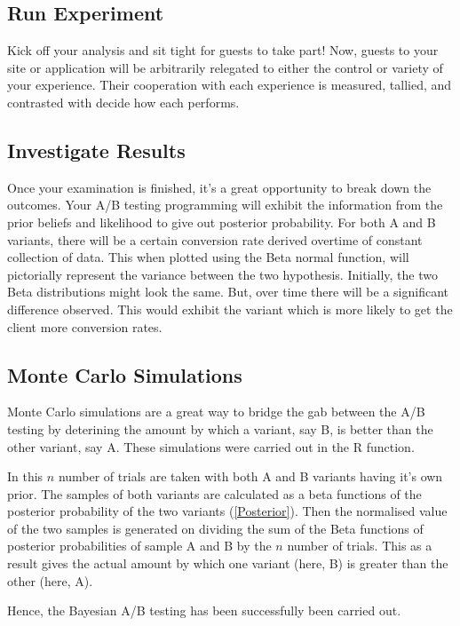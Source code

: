 \subsection{Run Experiment}
Kick off your analysis and sit tight for guests to take part! Now, guests to your site or application will be arbitrarily relegated to either the control or variety of your experience. Their cooperation with each experience is measured, tallied, and contrasted with decide how each performs.

\subsection{Investigate Results}
Once your examination is finished, it's a great opportunity to break down the outcomes. Your A/B testing programming will exhibit the information from the prior beliefs and likelihood to give out posterior probability.
For both A and B variants, there will be a certain conversion rate derived overtime of constant collection of data. This when plotted using the Beta normal function, will pictorially represent the variance between the two hypothesis. Initially, the two Beta distributions might look the same. But, over time there will be a significant difference observed. This would exhibit the variant which is more likely to get the client more conversion rates.

\subsection{Monte Carlo Simulations}
Monte Carlo simulations are a great way to bridge the gab between the A/B testing by deterining the amount by which a variant, say B, is better than the other variant, say A. These simulations were carried out in the R function.

In this $n$ number of trials are taken with both A and B variants having it's own prior. The samples of both variants are calculated as a beta functions of the posterior probability of the two variants (\ref{Posterior}).
Then the normalised value of the two samples is generated on dividing the sum of the Beta functions of posterior probabilities of sample A and B by the $n$ number of trials. This as a result gives the actual amount by which one variant (here, B) is greater than the other (here, A).

Hence, the Bayesian A/B testing has been successfully been carried out.